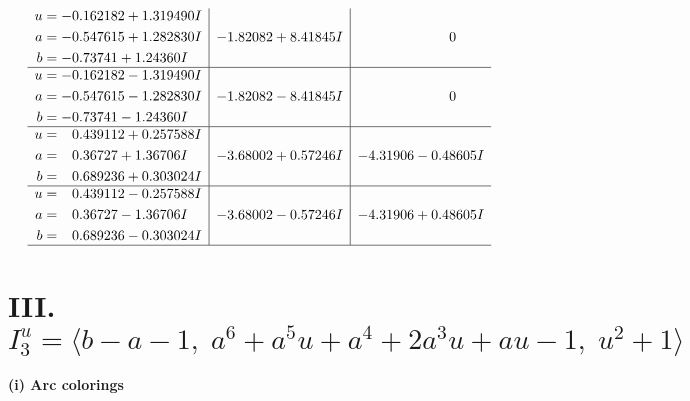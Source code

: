 \documentclass[1p]{elsarticle_modified}
\theoremstyle{definition}
\begin{document}
$$\begin{array}{c|c|c}
\begin{aligned}
u &= -0.162182 + 1.319490 I \\
a &= -0.547615 + 1.282830 I \\
b &= -0.73741 + 1.24360 I\end{aligned}
 & -1.82082 + 8.41845 I & \phantom{-0.000000 } 0 \\ \hline\begin{aligned}
u &= -0.162182 - 1.319490 I \\
a &= -0.547615 - 1.282830 I \\
b &= -0.73741 - 1.24360 I\end{aligned}
 & -1.82082 - 8.41845 I & \phantom{-0.000000 } 0 \\ \hline\begin{aligned}
u &= \phantom{-}0.439112 + 0.257588 I \\
a &= \phantom{-}0.36727 + 1.36706 I \\
b &= \phantom{-}0.689236 + 0.303024 I\end{aligned}
 & -3.68002 + 0.57246 I & -4.31906 - 0.48605 I \\ \hline\begin{aligned}
u &= \phantom{-}0.439112 - 0.257588 I \\
a &= \phantom{-}0.36727 - 1.36706 I \\
b &= \phantom{-}0.689236 - 0.303024 I\end{aligned}
 & -3.68002 - 0.57246 I & -4.31906 + 0.48605 I\\
 \hline 
 \end{array}$$\newpage\newpage\renewcommand{\arraystretch}{1}
\centering \section*{III. $I^u_{3}= \langle b- a-1,\;a^6+a^5 u+a^4+2 a^3 u+a u-1,\;u^2+1 \rangle$}
\flushleft \textbf{(i) Arc colorings}\\
\end{document}
